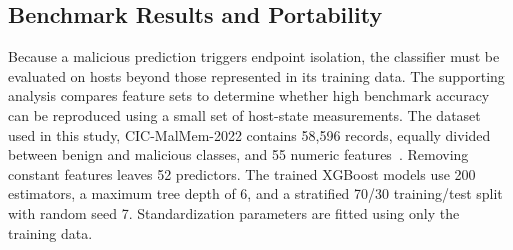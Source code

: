 \documentclass[conference]{IEEEtran}
\begin{document}
\subsection{Benchmark Results and Portability}



Because a malicious prediction triggers endpoint isolation, the classifier must be evaluated on hosts beyond those represented in its training data. The supporting analysis compares feature sets to determine whether high benchmark accuracy can be reproduced using a small set of host-state measurements. The dataset used in this study, CIC-MalMem-2022 contains 58{,}596 records, equally divided between benign and malicious classes, and 55 numeric features~\cite{carrier2022,cicmalmem}. Removing constant features leaves 52 predictors. The trained XGBoost models use 200 estimators, a maximum tree depth of 6, and a stratified 70/30 training/test split with random seed 7. Standardization parameters are fitted using only the training data. 
\end{document}
